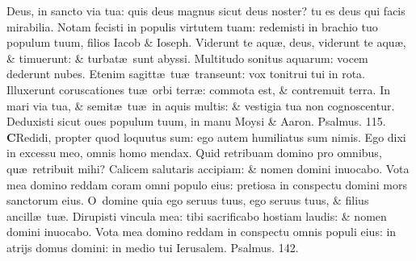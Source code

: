 \documentclass[a5paper,10pt]{book}
\def\ae{æ}
\begin{document}
\begin{multicols*}{2}
\newline \color{red} D\color{black}eus, in sancto via tua: quis deus magnus sicut deus noster? tu es deus qui facis mirabilia.
\newline \color{red} N\color{black}otam fecisti in populis virtutem tuam: redemisti in brachio tuo populum tuum, filios Iacob \& Ioseph.
\newline \color{red} V\color{black}iderunt te aqu\ae , deus, viderunt te aqu\ae , \& timuerunt: \& turbat\ae \ sunt abyssi.
\newline \color{red} M\color{black}ultitudo sonitus aquarum: vocem dederunt nubes.
\newline \color{red} E\color{black}tenim sagitt\ae \ tu\ae \ transeunt: vox tonitrui tui in rota.
\newline \color{red} I\color{black}lluxerunt coruscationes tu\ae \ orbi terr\ae : commota est, \& contremuit terra.
\newline \color{red} I\color{black}n mari via tua, \& semit\ae \ tu\ae \ in aquis multis: \& vestigia tua non cognoscentur.
\newline \color{red} D\color{black}eduxisti sicut oues populum tuum, in manu Moysi \& Aaron. \color{red} Psalmus. \hypertarget{ps115}{115.} \color{black}
\vspace{-.5em}
\lettrine[lines=2]{\bfseries \color{red} C}{}Redidi, propter quod loquutus sum: ego autem humiliatus sum nimis.
\newline \color{red} E\color{black}go dixi in excessu meo, omnis homo mendax.
\newline \color{red} Q\color{black}uid retribuam domino pro omnibus, qu\ae \ retribuit mihi?
\newline \color{red} C\color{black}alicem salutaris accipiam: \& nomen domini inuocabo.
\newline \color{red} V\color{black}ota mea domino reddam coram omni populo eius: pretiosa in conspectu domini mors sanctorum eius.
\newline \color{red} O\color{black}\ domine quia ego seruus tuus, ego seruus tuus, \& filius ancill\ae \ tu\ae .
\newline \color{red} D\color{black}irupisti vincula mea: tibi sacrificabo hostiam laudis: \& nomen domini inuocabo.
\newline \color{red} V\color{black}ota mea domino reddam in conspectu omnis populi eius: in atrijs domus domini: in medio tui Ierusalem.
\newline \color{red} Psalmus. \hypertarget{ps142}{142.} \color{black}

\end{multicols*}
\end{document}
